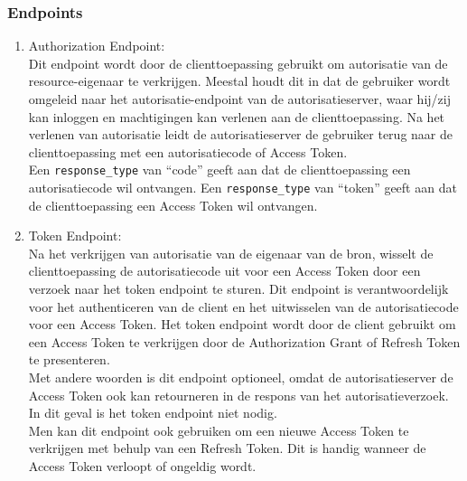 \subsubsection{Endpoints}%
\label{subsubsec:endpoints}
\begin{enumerate}[label=\textbf{-}]
    \item Authorization Endpoint: \\
    Dit endpoint wordt door de clienttoepassing gebruikt om autorisatie van de resource-eigenaar te verkrijgen. Meestal houdt dit in dat de gebruiker wordt omgeleid naar het autorisatie-endpoint van de autorisatieserver, waar hij/zij kan inloggen en machtigingen kan verlenen aan de clienttoepassing. Na het verlenen van autorisatie leidt de autorisatieserver de gebruiker terug naar de clienttoepassing met een autorisatiecode of Access Token.
    \\
    Een \texttt{response\_type} van ``code'' geeft aan dat de clienttoepassing een autorisatiecode wil ontvangen. Een \texttt{response\_type} van ``token'' geeft aan dat de clienttoepassing een Access Token wil ontvangen.
  
    \item Token Endpoint: \\
    Na het verkrijgen van autorisatie van de eigenaar van de bron, wisselt de clienttoepassing de autorisatiecode uit voor een Access Token door een verzoek naar het token endpoint te sturen. Dit endpoint is verantwoordelijk voor het authenticeren van de client en het uitwisselen van de autorisatiecode voor een Access Token. Het token endpoint wordt door de client gebruikt om een Access Token te verkrijgen door de Authorization Grant of Refresh Token te presenteren.
    \\
    Met andere woorden is dit endpoint optioneel, omdat de autorisatieserver de Access Token ook kan retourneren in de respons van het autorisatieverzoek. In dit geval is het token endpoint niet nodig.
    \\
    Men kan dit endpoint ook gebruiken om een nieuwe Access Token te verkrijgen met behulp van een Refresh Token. Dit is handig wanneer de Access Token verloopt of ongeldig wordt.
  

\end{enumerate}
